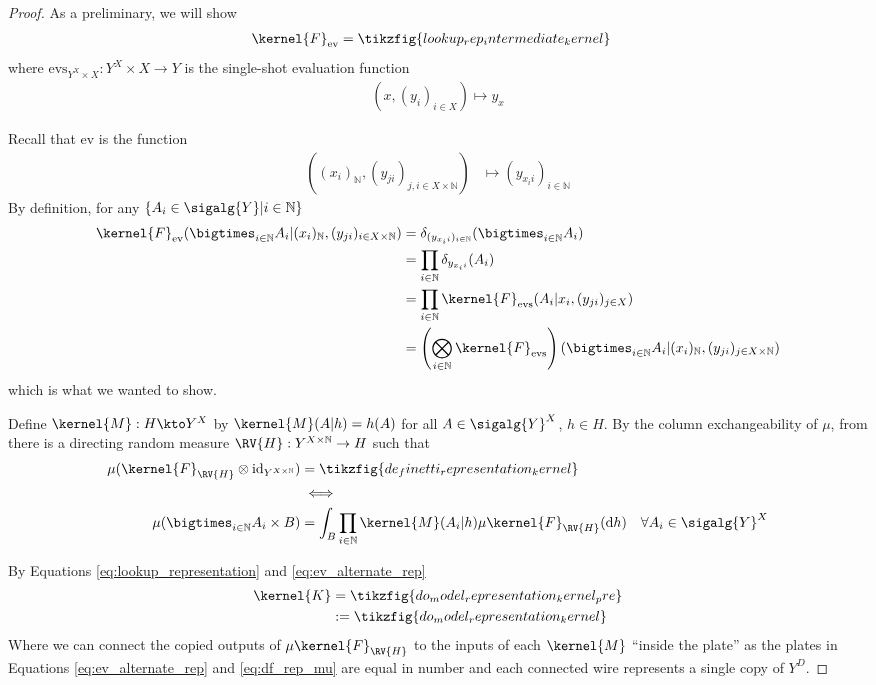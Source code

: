 \begin{proof}
As a preliminary, we will show
\begin{align}
    \kernel{F}_{\mathrm{ev}} &= \tikzfig{lookup_rep_intermediate_kernel}\label{eq:ev_alternate_rep}
\end{align}
where  $\mathrm{evs}_{Y^X\times X}:Y^X\times X\to Y$ is the single-shot evaluation function
\begin{align}
    (x,(y_i)_{i\in X})\mapsto y_x
\end{align}

Recall that $\mathrm{ev}$ is the function
\begin{align}
    ((x_i)_\mathbb{N},(y_{ji})_{j,i\in X\times \mathbb{N}})&\mapsto (y_{x_i i})_{i\in \mathbb{N}}
\end{align}
By definition, for any $\{A_i\in\sigalg{Y}|i\in \mathbb{N}\}$
\begin{align}
    \kernel{F}_{\mathrm{ev}}(\bigtimes_{i\in \mathbb{N}}A_i|(x_i)_\mathbb{N},(y_{ji})_{i\in X\times \mathbb{N}}) &= \delta_{(y_{x_i i})_{i\in \mathbb{N}}}(\bigtimes_{i\in \mathbb{N}}A_i)\\
        &= \prod_{i\in \mathbb{N}} \delta_{y_{x_i i}} (A_i)\\
        &= \prod_{i\in \mathbb{N}} \kernel{F}_{\text{evs}} (A_i|x_i,(y_{ji})_{j\in X})\\
        &= \left(\bigotimes_{i\in\mathbb{N}} \kernel{F}_{\mathrm{evs}} \right)(\bigtimes_{i\in \mathbb{N}}A_i|(x_i)_\mathbb{N},(y_{ji})_{j\in X\times \mathbb{N}})
\end{align}
which is what we wanted to show.

Define $\kernel{M}:H\kto Y^X$ by $\kernel{M}(A|h)=h(A)$ for all $A\in\sigalg{Y}^X$, $h\in H$. By the column exchangeability of $\mu$, from \citet[Prop. 1.4]{kallenberg_basic_2005} there is a directing random measure $\RV{H}:Y^{X\times\mathbb{N}}\to H$ such that
\begin{align}
    \mu(\kernel{F}_{\RV{H}}\otimes \mathrm{id}_{Y^{X\times\mathbb{N}}}) &= \tikzfig{de_finetti_representation_kernel}\label{eq:df_rep_mu}\\
    &\iff\\
    \mu(\bigtimes_{i\in \mathbb{N}} A_i\times B) &= \int_B \prod_{i\in \mathbb{N}} \kernel{M}(A_i|h) \mu\kernel{F}_{\RV{H}}(\mathrm{d}h)&\forall A_i\in\sigalg{Y}^X
\end{align}

By Equations \ref{eq:lookup_representation} and \ref{eq:ev_alternate_rep}
\begin{align}
    \kernel{K} &= \tikzfig{do_model_representation_kernel_pre}\\
    &:= \tikzfig{do_model_representation_kernel}\label{eq:lup_rep_combined}
\end{align}
Where we can connect the copied outputs of $\mu\kernel{F}_{\RV{H}}$ to the inputs of each $\kernel{M}$ ``inside the plate'' as the plates in Equations \ref{eq:ev_alternate_rep} and \ref{eq:df_rep_mu} are equal in number and each connected wire represents a single copy of $Y^D$.
\end{proof}

